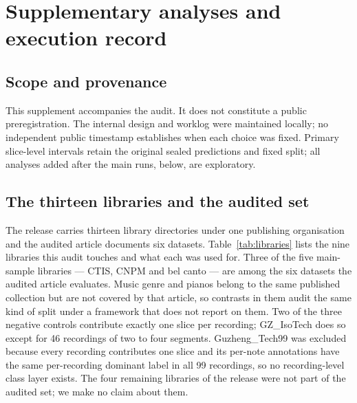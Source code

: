 \section{Supplementary analyses and execution record}

\subsection{Scope and provenance}

This supplement accompanies the audit. It does not constitute a public preregistration. The internal design and worklog were maintained locally; no independent public timestamp establishes when each choice was fixed. Primary slice-level intervals retain the original sealed predictions and fixed split; all analyses added after the main runs, below, are exploratory.

\subsection{The thirteen libraries and the audited set}

The release carries thirteen library directories under one publishing organisation and the audited
article documents six datasets. Table~\ref{tab:libraries} lists the nine libraries this audit
touches and what each was used for. Three of the five main-sample libraries --- CTIS, CNPM and bel canto --- are
among the six datasets the audited article evaluates. Music genre and pianos belong to the same
published collection but are not covered by that article, so contrasts in them audit the same
kind of split under a framework that does not report on them. Two of the three negative controls
contribute exactly one slice per recording; GZ\_IsoTech does so except for 46 recordings of two to
four segments. Guzheng\_Tech99 was excluded because every recording contributes one slice and its
per-note annotations have the same per-recording dominant label in all 99 recordings, so no
recording-level class layer exists. The four remaining libraries of the release were not part of
the audited set; we make no claim about them.

